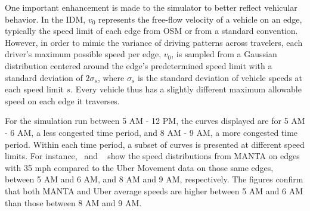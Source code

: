 \documentclass[final]{IEEEtran}
\begin{document}
One important enhancement is made to the simulator to better reflect vehicular behavior. In the IDM, $v_0$ represents the free-flow velocity of a vehicle on an edge, typically the speed limit of each edge from OSM or from a standard convention. However, in order to mimic the variance of driving patterns across travelers, each driver's maximum possible speed per edge, $v_0$, is sampled from a Gaussian distribution centered around the edge's predetermined speed limit with a standard deviation of $2\sigma_s$, where $\sigma_s$ is the standard deviation of vehicle speeds at each speed limit $s$. Every vehicle thus has a slightly different maximum allowable speed on each edge it traverses.

For the simulation run between 5 AM - 12 PM, the curves displayed are for 5 AM - 6 AM, a less congested time period, and 8 AM - 9 AM, a more congested time period. Within each time period, a subset of curves is presented at different speed limits. For instance,~ and ~ show the speed distributions from MANTA on edges with 35 mph compared to the Uber Movement data on those same edges, between 5 AM and 6 AM, and 8 AM and 9 AM, respectively. The figures confirm that both MANTA and Uber average speeds are higher between 5 AM and 6 AM than those between 8 AM and 9 AM.
\end{document}

